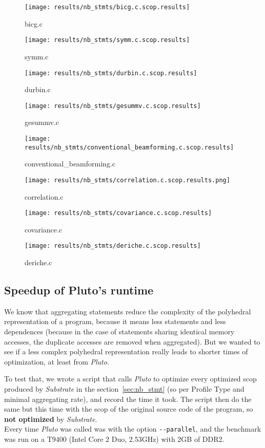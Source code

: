 \documentclass[paper=a4, fontsize=11.5pt]{scrartcl}
\numberwithin{equation}{section}        %
\numberwithin{figure}{section}          %
\numberwithin{table}{section}               %
\begin{document}
\begin{figure}[H]
    \center
    \texttt{[image: results/nb\_stmts/bicg.c.scop.results]}
    \caption{bicg.c}\label{fig:nb_stmts:bicg}
    \texttt{[image: results/nb\_stmts/symm.c.scop.results]}
    \caption{symm.c}\label{fig:nb_stmts:symm}
\end{figure}
\begin{figure}[H]
    \center
    \texttt{[image: results/nb\_stmts/durbin.c.scop.results]}
    \caption{durbin.c}\label{fig:nb_stmts:durbin}
    \texttt{[image: results/nb\_stmts/gesummv.c.scop.results]}
    \caption{gesummv.c}\label{fig:nb_stmts:gesummv}
\end{figure}
\begin{figure}[H]
    \center
    \texttt{[image: results/nb\_stmts/conventional\_beamforming.c.scop.results]}
    \caption{conventional\_beamforming.c}\label{fig:nb_stmts:conv_beam}
    \texttt{[image: results/nb\_stmts/correlation.c.scop.results.png]}
    \caption{correlation.c}\label{fig:nb_stmts:correlation}
\end{figure}
\begin{figure}[H]
    \center
    \texttt{[image: results/nb\_stmts/covariance.c.scop.results]}
    \caption{covariance.c}\label{fig:nb_stmts:covariance}
    \texttt{[image: results/nb\_stmts/deriche.c.scop.results]}
    \caption{deriche.c}\label{fig:nb_stmts:deriche}
\end{figure}
\restoregeometry

\subsection{Speedup of Pluto's runtime}
\label{sec:speedup_pluto}

We know that aggregating statements reduce the complexity of the polyhedral representation
of a program, because it means less statements and less dependences (because in the case
of statements sharing identical memory accesses, the duplicate accesses are removed when aggregated).
But we wanted to see if a less complex polyhedral representation really leads to shorter
times of optimization, at least from \textit{Pluto}.

\bigskip

To test that, we wrote a script that calls \textit{Pluto} to optimize every optimized scop produced
by \textit{Substrate} in the section~\ref{sec:nb_stmt} (so per Profile Type and minimal aggregating rate),
and record the time it took. The script then do the same but this time with the scop of
the original source code of the program, so \textbf{not optimized} by \textit{Substrate}.\\
Every time \textit{Pluto} was called was with the option \verb'--parallel', and the benchmark
was run on a T9400 (Intel Core 2 Duo, 2.53GHz) with 2GB of DDR2.
\end{document}
